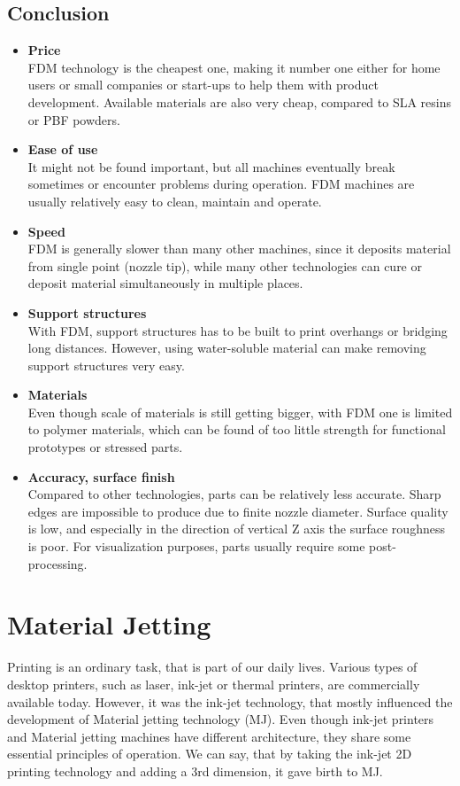 \documentclass[a4paper, 11pt, reqno]{report}
\newcommand\pro{\item[$+$]}
\newcommand\con{\item[$-$]}
\begin{document}
\section{Conclusion}
\begin{itemize}
\pro \textbf{Price}\\
FDM technology is the cheapest one, making it number one either for home users or small companies or start-ups to help them with product development. Available materials are also very cheap, compared to SLA resins or PBF powders.

\pro \textbf{Ease of use}\\
It might not be found important, but all machines eventually break sometimes or encounter problems during operation. FDM machines are usually relatively easy to clean, maintain and operate.
\\[10pt]

\con \textbf{Speed}\\
FDM is generally slower than many other machines, since it deposits material from single point (nozzle tip), while many other technologies can cure or deposit material simultaneously in multiple places.

\con \textbf{Support structures}\\
With FDM, support structures has to be built to print overhangs or bridging long distances. However, using water-soluble material can make removing support structures very easy.

\con \textbf{Materials}\\
Even though scale of materials is still getting bigger, with FDM one is limited to polymer materials, which can be found of too little strength for functional prototypes or stressed parts.

\con \textbf{Accuracy, surface finish}\\
Compared to other technologies, parts can be relatively less accurate. Sharp edges are impossible to produce due to finite nozzle diameter. Surface quality is low, and especially in the direction of vertical Z axis the surface roughness is poor. For visualization purposes, parts usually require some post-processing.
\end{itemize}

\chapter{Material Jetting}

Printing is an ordinary task, that is part of our daily lives. Various types of desktop printers, such as laser, ink-jet or thermal printers, are commercially available today. However, it was the ink-jet technology, that mostly influenced the development of Material jetting technology (MJ). Even though ink-jet printers and Material jetting machines have different architecture, they share some essential principles of operation. We can say, that by taking the ink-jet 2D printing technology and adding a 3rd dimension, it gave birth to MJ.
\end{document}
